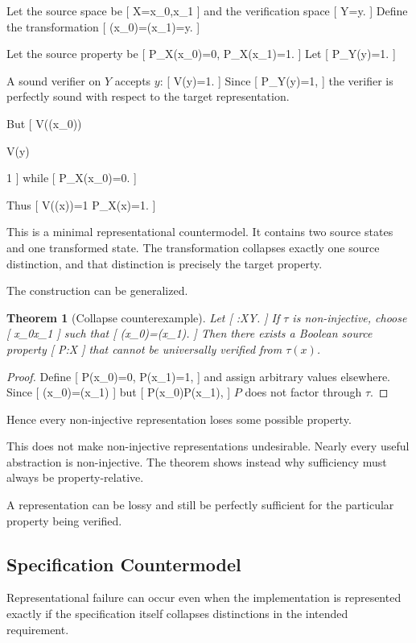 \documentclass[11pt]{article}
\newtheorem{theorem}{Theorem} \newtheorem{proposition}{Proposition} \newtheorem{lemma}{Lemma} \newtheorem{corollary}{Corollary} \newtheorem{definition}{Definition} \newtheorem{remark}{Remark}
\begin{document}
Let the source space be
[
X={x_0,x_1}
]
and the verification space
[
Y={y}.
]
Define the transformation
[
\tau(x_0)=\tau(x_1)=y.
]

Let the source property be
[
P_X(x_0)=0,
\qquad
P_X(x_1)=1.
]
Let
[
P_Y(y)=1.
]

A sound verifier on $Y$ accepts $y$:
[
\mathcal V(y)=1.
]
Since
[
P_Y(y)=1,
]
the verifier is perfectly sound with respect to the target representation.

But
[
\mathcal V(\tau(x_0))

\mathcal V(y)

1
]
while
[
P_X(x_0)=0.
]

Thus
[
\mathcal V(\tau(x))=1
\not\Rightarrow
P_X(x)=1.
]

This is a minimal representational countermodel. It contains two source states and one transformed state. The transformation collapses exactly one source distinction, and that distinction is precisely the target property.

The construction can be generalized.

\begin{theorem}[Collapse counterexample]
Let
[
\tau:X\to Y.
]
If $\tau$ is non-injective, choose
[
x_0\neq x_1
]
such that
[
\tau(x_0)=\tau(x_1).
]
Then there exists a Boolean source property
[
P:X
]
that cannot be universally verified from $\tau(x)$.
\end{theorem}

\begin{proof}
Define
[
P(x_0)=0,
\qquad
P(x_1)=1,
]
and assign arbitrary values elsewhere. Since
[
\tau(x_0)=\tau(x_1)
]
but
[
P(x_0)\neq P(x_1),
]
$P$ does not factor through $\tau$.
\end{proof}

Hence every non-injective representation loses some possible property.

This does not make non-injective representations undesirable. Nearly every useful abstraction is non-injective. The theorem shows instead why sufficiency must always be property-relative.

A representation can be lossy and still be perfectly sufficient for the particular property being verified.

\subsection{Specification Countermodel}

Representational failure can occur even when the implementation is represented exactly if the specification itself collapses distinctions in the intended requirement.
\end{document}
